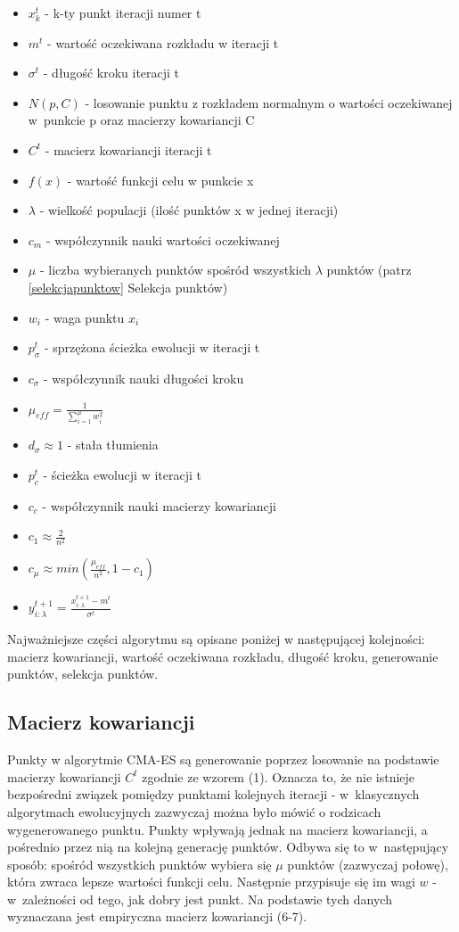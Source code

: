 \documentclass{mini}
\begin{document}
\begin{itemize}[noitemsep]
\item $x_k^t$ - k-ty punkt iteracji numer t
\item $m^t$ - wartość oczekiwana rozkładu w iteracji t
\item $\sigma^t$ - długość kroku iteracji t
\item $N(p,C)$ - losowanie punktu z rozkładem normalnym o wartości oczekiwanej w~punkcie p oraz macierzy kowariancji C
\item $C^t$ - macierz kowariancji iteracji t
\item $f(x)$ - wartość funkcji celu w punkcie x
\item $\lambda$ - wielkość populacji (ilość punktów x w jednej iteracji)
\item $c_m$ - współczynnik nauki wartości oczekiwanej
\item $\mu$ - liczba wybieranych punktów spośród wszystkich $\lambda$ punktów (patrz \ref{selekcjapunktow} Selekcja punktów)
\item $w_i$ - waga punktu $x_i$
\item $p_\sigma^t$ - sprzężona ścieżka ewolucji w iteracji t
\item $c_\sigma$ - współczynnik nauki długości kroku
\item $\mu_{eff}=\frac{1}{\sum\limits_{i=1}^\mu w_i^2}$
\item $d_\sigma \approx 1$ - stała tłumienia
\item $p_c^t$ - ścieżka ewolucji w iteracji t
\item $c_c$ - współczynnik nauki macierzy kowariancji
\item $c_1 \approx \frac{2}{n^2}$
\item $c_\mu \approx min(\frac{\mu_{eff}}{n^2}, 1-c_1)$
\item $y_{i:\lambda}^{t+1} = \frac{x_{i:\lambda}^{t+1}-m^t}{\sigma^t}$
\end{itemize}

Najważniejsze części algorytmu są opisane poniżej w następującej kolejności: macierz kowariancji, wartość oczekiwana rozkładu, długość kroku, generowanie punktów, selekcja punktów.

\subsection{Macierz kowariancji} \label{macierz}
\hspace{3,4ex}Punkty w algorytmie CMA-ES są generowanie poprzez losowanie na podstawie macierzy kowariancji $C^t$ zgodnie ze wzorem (1). Oznacza to, że nie istnieje bezpośredni związek pomiędzy punktami kolejnych iteracji - w~klasycznych algorytmach ewolucyjnych zazwyczaj można było mówić o rodzicach wygenerowanego punktu. Punkty wpływają jednak na macierz kowariancji, a pośrednio przez nią na kolejną generację punktów. Odbywa się to w~następujący sposób: spośród wszystkich punktów wybiera się $\mu$ punktów (zazwyczaj połowę), która zwraca lepsze wartości funkcji celu. Następnie przypisuje się im wagi $w$ - w~zależności od tego, jak dobry jest punkt. Na podstawie tych danych wyznaczana jest empiryczna macierz kowariancji (6-7).
\end{document}
